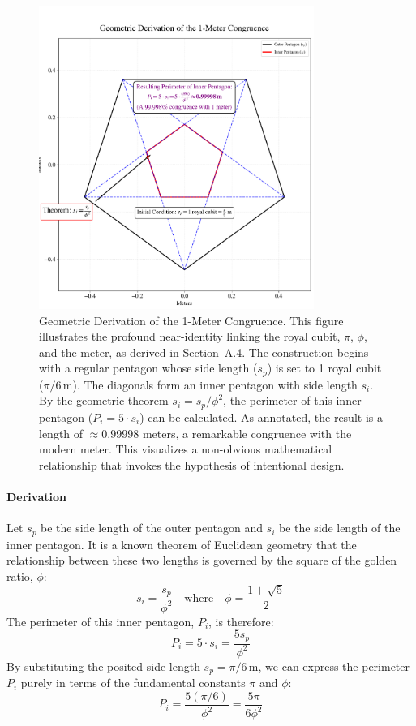 \documentclass[11pt]{article}
\begin{document}
\begin{figure}[h!]
\centering
\includegraphics[width=0.8\textwidth]{figures/congruence-penta-fig.png}
\caption{Geometric Derivation of the 1-Meter Congruence. This figure illustrates the profound near-identity linking the royal cubit, $\pi$, $\phi$, and the meter, as derived in Section~A.4. The construction begins with a regular pentagon whose side length ($s_p$) is set to 1 royal cubit ($\pi/6\,\text{m}$). The diagonals form an inner pentagon with side length $s_i$. By the geometric theorem $s_i = s_p / \phi^2$, the perimeter of this inner pentagon ($P_i = 5 \cdot s_i$) can be calculated. As annotated, the result is a length of $\approx 0.99998$ meters, a remarkable congruence with the modern meter. This visualizes a non-obvious mathematical relationship that invokes the hypothesis of intentional design.}
\label{fig:congruence_penta}
\end{figure}

\paragraph{Derivation}

Let $s_p$ be the side length of the outer pentagon and $s_i$ be the side length of the inner pentagon. It is a known theorem of Euclidean geometry that the relationship between these two lengths is governed by the square of the golden ratio, $\phi$:
\[
s_i = \frac{s_p}{\phi^2} \quad \text{where} \quad \phi = \frac{1 + \sqrt{5}}{2}
\]
The perimeter of this inner pentagon, $P_i$, is therefore:
\[
P_i = 5 \cdot s_i = \frac{5s_p}{\phi^2}
\]
By substituting the posited side length $s_p = \pi/6\,\text{m}$, we can express the perimeter $P_i$ purely in terms of the fundamental constants $\pi$ and $\phi$:
\[
P_i = \frac{5(\pi/6)}{\phi^2} = \frac{5\pi}{6\phi^2}
\]
\end{document}

